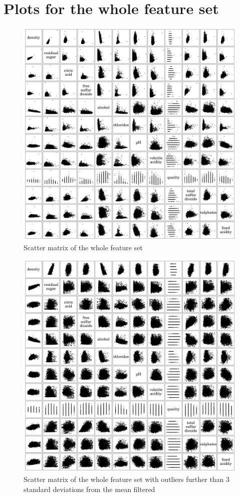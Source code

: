 \documentclass{report}
\begin{document}
\newpage\section{Plots for the whole feature set}

\begin{figure}[H]
\includegraphics[width=\textwidth]{scattermatrix.png}
\caption{Scatter matrix of the whole feature set}
\end{figure}

\begin{figure}[H]
\includegraphics[width=\textwidth]{scattermatrix_filtered.png}
\caption{Scatter matrix of the whole feature set with outliers further than 3 standard deviations from the mean filtered}
\end{figure}
\end{document}
